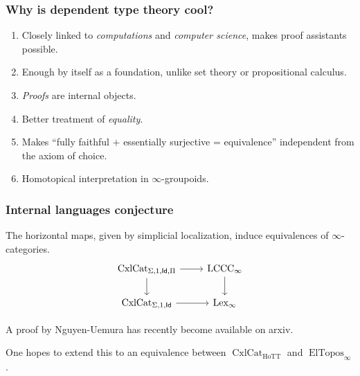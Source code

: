 \documentclass{beamer}
\DeclareMathOperator{\Id}{\mathsf{Id}}
\DeclareMathOperator{\cxl}{CxlCat}
\DeclareMathOperator{\HoTT}{HoTT}
\DeclareMathOperator{\ElTopos}{ElTopos}
\DeclareMathOperator{\lexi}{Lex_\infty}
\DeclareMathOperator{\lccci}{LCCC_\infty}
\begin{document}
\begin{frame}
  \frametitle{Why is dependent type theory cool?}

  \begin{enumerate}
    \item Closely linked to \emph{computations} and \emph{computer science},
      makes proof assistants possible.
    \item Enough by itself as a foundation, unlike set theory or propositional
      calculus.
    \item \emph{Proofs} are internal objects.
    \item Better treatment of \emph{equality}.
    \item Makes ``fully faithful $+$ essentially surjective = equivalence''
      independent from the axiom of choice.
    \item Homotopical interpretation in $\infty$-groupoids.
  \end{enumerate}
\end{frame}

\begin{frame}
  \frametitle{Internal languages conjecture}

  \begin{conj}
    The horizontal maps, given by simplicial localization, induce
    equivalences of $\infty$-categories.
    \[\begin{tikzcd}[ampersand replacement=\&]
      {\cxl_{\Sigma,1,\Id,\Pi}} \& {\lccci} \\
      {\cxl_{\Sigma,1,\Id}} \& {\lexi}
      \arrow[from=1-1, to=2-1]
      \arrow[from=1-2, to=2-2]
      \arrow[from=2-1, to=2-2]
      \arrow[from=1-1, to=1-2]
    \end{tikzcd}\]
  \end{conj}

  A proof by Nguyen-Uemura has recently become available on arxiv.

  One hopes to extend this to an equivalence between $\cxl_{\HoTT}$ and
  $\ElTopos_\infty$.
\end{frame}
\end{document}
